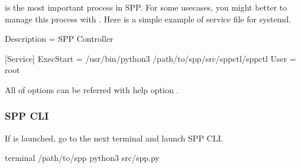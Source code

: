 \documentclass[a4paper,11pt,openany,oneside,english]{sphinxmanual}
\begin{document}
 is the most important process in SPP. For some usecases,
you might better to manage this process with .
Here is a simple example of service file for systemd.

\begin{sphinxVerbatim}[commandchars=\\\{\},formatcom=\footnotesize]
[Unit]
Description = SPP Controller

[Service]
ExecStart = /usr/bin/python3 /path/to/spp/src/spp\PYGZhy{}ctl/spp\PYGZhy{}ctl
User = root
\end{sphinxVerbatim}

All of options can be referred with help option .

\begin{sphinxVerbatim}[commandchars=\\\{\},formatcom=\footnotesize]


\end{sphinxVerbatim}


\subsubsection{SPP CLI}
\label{\detokenize{gsg/howto_use:spp-cli}}\label{\detokenize{gsg/howto_use:spp-setup-howto-use-spp-cli}}
If  is launched, go to the next terminal and launch SPP CLI.

\begin{sphinxVerbatim}[commandchars=\\\{\},formatcom=\footnotesize]
 terminal 
  /path/to/spp
 python3 src/spp.py

\end{sphinxVerbatim}
\end{document}
